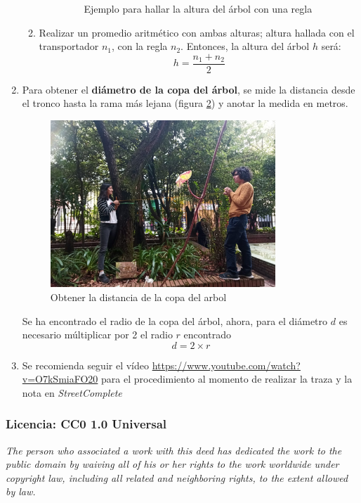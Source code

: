 \documentclass{article}
\begin{document}
\begin{enumerate}
\begin{enumerate}
\begin{itemize}
\begin{figure}[H]
                          \caption{Ejemplo para hallar la altura del árbol con una regla}
                          \label{fig:altura-regla}
                        \end{figure}
                \end{itemize}
          \item Realizar un promedio aritmético con ambas alturas; altura hallada con el transportador \(n_{1}\), con la regla \(n_{2}\). Entonces, la altura del árbol \(h\) será:
                \[
                h = \frac{n_{1} + n_{2}}{2}
                \]
        \end{enumerate}
  \item Para obtener el \textbf{diámetro de la copa del árbol}, se mide la distancia desde el tronco hasta la rama más lejana (figura \ref{fig:copa-arbol}) y anotar la medida en metros.
        \begin{figure}[H]
          \centering
          \includegraphics[width=0.8\textwidth]{img/Copa.jpg}
          \caption{Obtener la distancia de la copa del arbol}
          \label{fig:copa-arbol}
        \end{figure}

        Se ha encontrado el radio de la copa del árbol, ahora, para el diámetro \(d\) es necesario múltiplicar por 2 el radio \(r\) encontrado
        \[
        d = 2 \times r
        \]
  \item Se recomienda seguir el vídeo \url{https://www.youtube.com/watch?v=O7kSmiaFO20} para el procedimiento al momento de realizar la traza y la nota en \textit{StreetComplete}
\end{enumerate}

\subsubsection*{Licencia: CC0 1.0 Universal }

\textit{The person who associated a work with this deed has dedicated the work to the public domain by waiving all of his or her rights to the work worldwide under copyright law, including all related and neighboring rights, to the extent allowed by law.}
\end{document}
